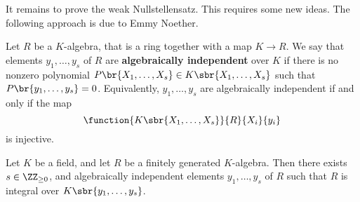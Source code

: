 It remains to prove the weak Nullstellensatz. This requires some new ideas. The following approach is due to Emmy Noether.

\begin{definition}
Let $ R $ be a $ K $-algebra, that is a ring together with a map $ K \to R $. We say that elements $ y_1, \dots, y_s $ of $ R $ are \textbf{algebraically independent} over $ K $ if there is no nonzero polynomial $ P\br{X_1, \dots, X_s} \in K\sbr{X_1, \dots, X_s} $ such that $ P\br{y_1, \dots, y_s} = 0 $. Equivalently, $ y_1, \dots, y_s $ are algebraically independent if and only if the map
$$ \function{K\sbr{X_1, \dots, X_s}}{R}{X_i}{y_i} $$
is injective.
\end{definition}

\begin{proposition}
Let $ K $ be a field, and let $ R $ be a finitely generated $ K $-algebra. Then there exists $ s \in \ZZ_{\ge 0} $, and algebraically independent elements $ y_1, \dots, y_s $ of $ R $ such that $ R $ is integral over $ K\sbr{y_1, \dots, y_s} $.
\end{proposition}

\pagebreak

